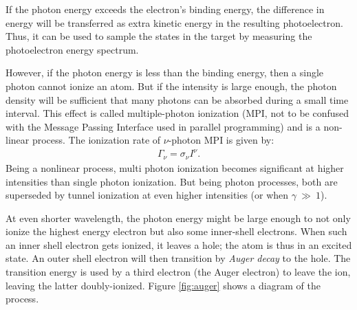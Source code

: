 If the photon energy exceeds the electron's binding energy, the difference in energy
will be transferred as extra kinetic energy in the
resulting photoelectron. Thus, it can be used to sample the states in the
target by measuring the photoelectron energy spectrum\cite{Fennel2010}.

However, if the photon energy is less than the binding energy, then a single
photon cannot ionize an atom. But if the intensity is large enough, the
photon density will be sufficient that many photons can be absorbed during a
small time interval.
This effect is called multiple-photon ionization (MPI, not to
be confused with the Message Passing Interface used in parallel programming) and
is a non-linear process. The ionization rate of $\nu$-photon MPI is given
by\cite{Fennel2010}:
\begin{align}
\Gamma_{\nu} = \sigma_{\nu} I^{\nu}.
\label{eqn:ionization:rate:mpi}
\end{align}
Being a nonlinear process, multi photon ionization becomes significant at higher
intensities than single photon ionization. But being photon processes, both are
superseded by tunnel ionization at even higher intensities (or when
$\gamma~\gg~1$).


{}

At even shorter wavelength, the photon energy might be large enough to not only
ionize the highest energy electron but also some inner-shell electrons.
When such an inner shell electron gets ionized, it leaves a hole; the atom is
thus in an excited state. An outer shell electron will then transition by
\textit{Auger decay} to the hole. The transition energy is used by a third
electron (the Auger electron) to leave the ion, leaving the latter
doubly-ionized. Figure \ref{fig:auger} shows a diagram of the process.


